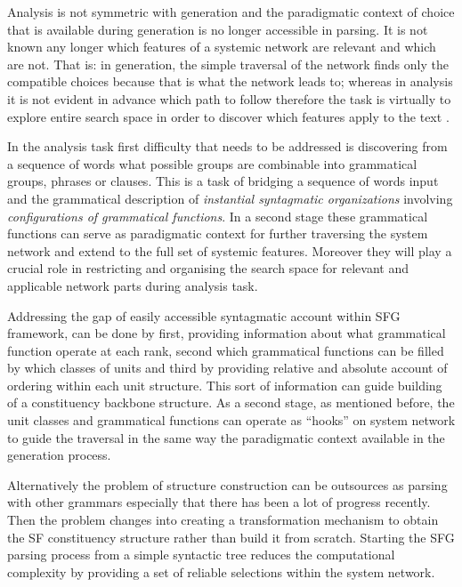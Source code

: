 Analysis is not symmetric with generation and the paradigmatic context of choice that is available during generation is no longer accessible in parsing. It is not known any longer which features of a systemic network are relevant and which are not. That is: in generation, the simple traversal of the network finds only the compatible choices because that is what the network leads to; whereas in analysis it is not evident in advance which path to follow therefore the task is virtually to explore entire search space in order to discover which features apply to the text \citep{Bateman2008}.

In the analysis task first difficulty that needs to be addressed is discovering from a sequence of words what possible groups are combinable into grammatical groups, phrases or clauses. This is a task of bridging a sequence of words input and the grammatical description of \textit{instantial syntagmatic organizations} involving \textit{configurations of grammatical functions}. In a second stage these grammatical functions can serve as paradigmatic context for further traversing the system network and extend to the full set of systemic features. Moreover they will play a crucial role in restricting and organising the search space for relevant and applicable network parts during analysis task.

Addressing the gap of easily accessible syntagmatic account within SFG framework, can be done by first, providing information about what grammatical function operate at each rank, second which grammatical functions can be filled by which classes of units and third by providing relative and absolute account of ordering within each unit structure. This sort of information can guide building of a constituency backbone structure. As a second stage, as mentioned before, the unit classes and grammatical functions can operate as ``hooks'' on system network to guide the traversal in the same way the paradigmatic context available in the generation process. 

Alternatively the problem of structure construction can be outsources as parsing with other grammars especially that there has been a lot of progress recently. Then the problem changes into creating a transformation mechanism to obtain the SF constituency structure rather than build it from scratch. Starting the SFG parsing process from a simple syntactic tree reduces the computational complexity by providing a set of reliable selections within the system network. 

